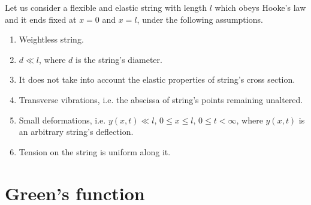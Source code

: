 \documentclass[12pt]{article}
\begin{document}
Let us consider a flexible and elastic string with length $l$ which obeys Hooke's law and it ends fixed at $x=0$ and $x=l$, under the following assumptions.
\begin{enumerate}
\item Weightless string.
\item $d \ll l$, where $d$ is the string's diameter.
\item It does not take into account the elastic properties of string's cross section.
\item Transverse vibrations, i.e. the abscissa of string's points remaining unaltered.
\item Small deformations, i.e. $y(x,t)\ll l$, $0\leq x\leq l$, $0\leq t < \infty$, where $y(x,t)$ is an arbitrary string's deflection.
\item Tension on the string is uniform along it.
\end{enumerate}

\section{Green's function}
\end{document}
